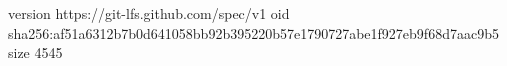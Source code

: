 version https://git-lfs.github.com/spec/v1
oid sha256:af51a6312b7b0d641058bb92b395220b57e1790727abe1f927eb9f68d7aac9b5
size 4545
